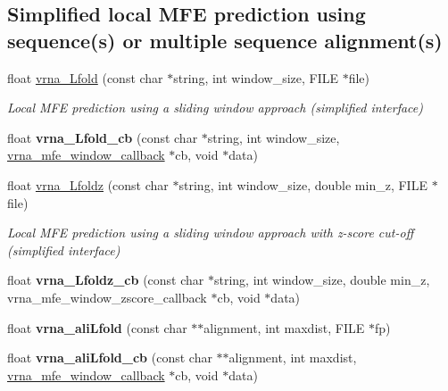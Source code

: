 \subsection*{Simplified local M\+FE prediction using sequence(s) or multiple sequence alignment(s)}
\begin{DoxyCompactItemize}
\item 
float \hyperlink{group__mfe__window_ga4918cce52bf69c1913cda503b2ac75d8}{vrna\+\_\+\+Lfold} (const char $\ast$string, int window\+\_\+size, F\+I\+LE $\ast$file)
\begin{DoxyCompactList}\small\item\em Local M\+FE prediction using a sliding window approach (simplified interface) \end{DoxyCompactList}\item 
\mbox{\label{group__mfe__window_ga8b70293ad3c9dd3dc384d06290bf8069}} 
float {\bfseries vrna\+\_\+\+Lfold\+\_\+cb} (const char $\ast$string, int window\+\_\+size, \hyperlink{group__mfe__window_ga4f3e5bc214ef803074ace313cb9571b4}{vrna\+\_\+mfe\+\_\+window\+\_\+callback} $\ast$cb, void $\ast$data)
\item 
float \hyperlink{group__mfe__window_ga27fddda5fc63eb49c861e38845fc34b4}{vrna\+\_\+\+Lfoldz} (const char $\ast$string, int window\+\_\+size, double min\+\_\+z, F\+I\+LE $\ast$file)
\begin{DoxyCompactList}\small\item\em Local M\+FE prediction using a sliding window approach with z-\/score cut-\/off (simplified interface) \end{DoxyCompactList}\item 
\mbox{\label{group__mfe__window_ga41b18568b846f1db70cdf2fe83b0ed47}} 
float {\bfseries vrna\+\_\+\+Lfoldz\+\_\+cb} (const char $\ast$string, int window\+\_\+size, double min\+\_\+z, vrna\+\_\+mfe\+\_\+window\+\_\+zscore\+\_\+callback $\ast$cb, void $\ast$data)
\item 
\mbox{\label{group__mfe__window_gaa43d3de352753529a4578cb02cd8bc52}} 
float {\bfseries vrna\+\_\+ali\+Lfold} (const char $\ast$$\ast$alignment, int maxdist, F\+I\+LE $\ast$fp)
\item 
\mbox{\label{group__mfe__window_ga09756293446a6ae67c783bc8d567d884}} 
float {\bfseries vrna\+\_\+ali\+Lfold\+\_\+cb} (const char $\ast$$\ast$alignment, int maxdist, \hyperlink{group__mfe__window_ga4f3e5bc214ef803074ace313cb9571b4}{vrna\+\_\+mfe\+\_\+window\+\_\+callback} $\ast$cb, void $\ast$data)
\end{DoxyCompactItemize}


